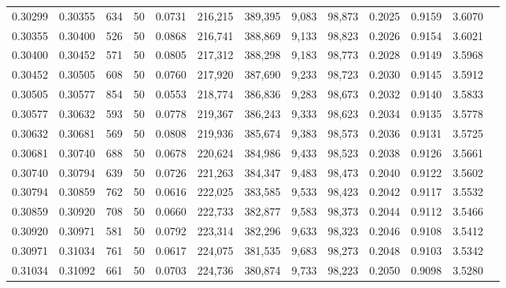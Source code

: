 \begin{tabular}{rrrrrrrrrrrrr}
0.30299 & 0.30355 &   634 &  50 &                                     0.0731 & 216,215 & 389,395 &   9,083 &  98,873 & 0.2025 & 0.9159 & 3.6070 \\
0.30355 & 0.30400 &   526 &  50 &                                     0.0868 & 216,741 & 388,869 &   9,133 &  98,823 & 0.2026 & 0.9154 & 3.6021 \\
0.30400 & 0.30452 &   571 &  50 &                                     0.0805 & 217,312 & 388,298 &   9,183 &  98,773 & 0.2028 & 0.9149 & 3.5968 \\
0.30452 & 0.30505 &   608 &  50 &                                     0.0760 & 217,920 & 387,690 &   9,233 &  98,723 & 0.2030 & 0.9145 & 3.5912 \\
0.30505 & 0.30577 &   854 &  50 &                                     0.0553 & 218,774 & 386,836 &   9,283 &  98,673 & 0.2032 & 0.9140 & 3.5833 \\
0.30577 & 0.30632 &   593 &  50 &                                     0.0778 & 219,367 & 386,243 &   9,333 &  98,623 & 0.2034 & 0.9135 & 3.5778 \\
0.30632 & 0.30681 &   569 &  50 &                                     0.0808 & 219,936 & 385,674 &   9,383 &  98,573 & 0.2036 & 0.9131 & 3.5725 \\
0.30681 & 0.30740 &   688 &  50 &                                     0.0678 & 220,624 & 384,986 &   9,433 &  98,523 & 0.2038 & 0.9126 & 3.5661 \\
0.30740 & 0.30794 &   639 &  50 &                                     0.0726 & 221,263 & 384,347 &   9,483 &  98,473 & 0.2040 & 0.9122 & 3.5602 \\
0.30794 & 0.30859 &   762 &  50 &                                     0.0616 & 222,025 & 383,585 &   9,533 &  98,423 & 0.2042 & 0.9117 & 3.5532 \\
0.30859 & 0.30920 &   708 &  50 &                                     0.0660 & 222,733 & 382,877 &   9,583 &  98,373 & 0.2044 & 0.9112 & 3.5466 \\
0.30920 & 0.30971 &   581 &  50 &                                     0.0792 & 223,314 & 382,296 &   9,633 &  98,323 & 0.2046 & 0.9108 & 3.5412 \\
0.30971 & 0.31034 &   761 &  50 &                                     0.0617 & 224,075 & 381,535 &   9,683 &  98,273 & 0.2048 & 0.9103 & 3.5342 \\
0.31034 & 0.31092 &   661 &  50 &                                     0.0703 & 224,736 & 380,874 &   9,733 &  98,223 & 0.2050 & 0.9098 & 3.5280 \\

\end{tabular}
